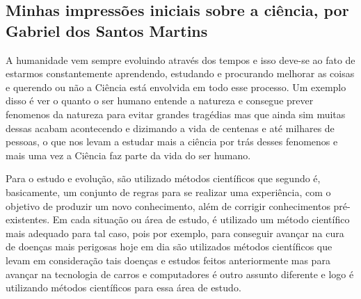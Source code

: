\subsection{Minhas impressões iniciais sobre a ciência, por Gabriel dos Santos Martins}

A humanidade vem sempre evoluindo através dos tempos e isso deve-se ao fato de estarmos constantemente aprendendo, estudando e procurando melhorar as coisas e querendo ou não a \gls{Ciência} está envolvida em todo esse processo. Um exemplo disso é ver o quanto o ser humano entende a natureza e consegue prever \gls{fenomeno}s da natureza para evitar grandes tragédias mas que ainda sim muitas dessas acabam acontecendo e dizimando a vida de centenas e até milhares de pessoas, o que nos levam a estudar mais a ciência por trás desses \gls{fenomeno}s e mais uma vez a \gls{Ciência} faz parte da vida do ser humano. 

Para o estudo e evolução, são utilizado métodos científicos que segundo \citep{} é, basicamente, um conjunto de regras para se realizar uma experiência, com o objetivo de produzir um novo conhecimento, além de corrigir conhecimentos pré-existentes.
Em cada situação ou área de estudo, é utilizado um método científico mais adequado para tal caso, pois por exemplo, para conseguir avançar na cura de doenças mais perigosas hoje em dia são utilizados métodos científicos que levam em consideração tais doenças e estudos feitos anteriormente mas para avançar na tecnologia de carros e computadores é outro assunto diferente e logo é utilizando métodos científicos para essa área de estudo. 